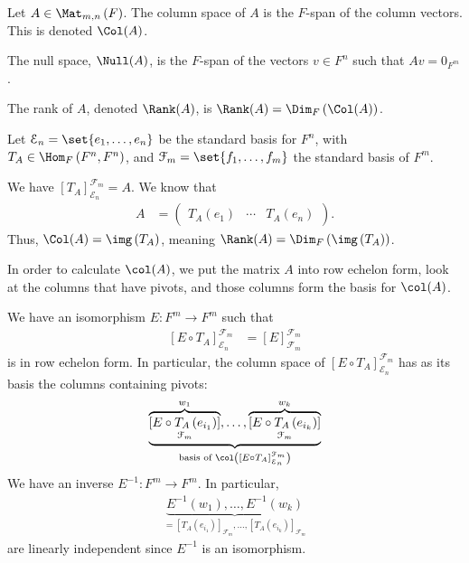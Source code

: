 \documentclass[10pt]{mypackage}
\begin{document}
\begin{definition}
  Let $A\in \Mat_{m,n}\left(F\right)$. The column space of $A$ is the $F$-span of the column vectors. This is denoted $\Col(A)$.\newline

  The null space, $\Null(A)$, is the $F$-span of the vectors $v\in F^n$ such that $Av = 0_{F^m}$.\newline

  The rank of $A$, denoted $\Rank(A)$, is $\Rank(A) = \Dim_{F}\left(\Col(A)\right)$.
\end{definition}
  Let $\mathcal{E}_n = \set{e_1,\dots,e_n}$ be the standard basis for $F^n$, with $T_A \in \Hom_{F}\left(F^n,F^n\right)$, and $\mathcal{F}_m = \set{f_1,\dots,f_m}$ the standard basis of $F^m$.\newline

  We have $\left[T_A\right]_{\mathcal{E}_n}^{\mathcal{F}_m} = A$. We know that
  \begin{align*}
    A &= \begin{pmatrix}T_A\left(e_1\right) & \cdots & T_A\left(e_n\right)\end{pmatrix}.
  \end{align*}
  Thus, $\Col(A) = \img\left(T_A\right)$, meaning $\Rank(A) = \Dim_{F}\left(\img\left(T_A\right)\right)$.\newline

In order to calculate $\col(A)$, we put the matrix $A$ into row echelon form, look at the columns that have pivots, and those columns form the basis for $\col(A)$.\newline

We have an isomorphism $E: F^m\rightarrow F^m$ such that
\begin{align*}
  \left[E\circ T_A\right]_{\mathcal{E}_n}^{\mathcal{F}_m} &= \left[E\right]_{\mathcal{F}_m}^{\mathcal{F}_m}
\end{align*}
is in row echelon form. In particular, the column space of $\left[E\circ T_A\right]_{\mathcal{E}_n}^{\mathcal{F}_m}$ has as its basis the columns containing pivots:
\begin{align*}
  \underbrace{\overbrace{\left[E\circ T_A\left(e_{i_1}\right)\right]}^{w_1}_{\mathcal{F}_m},\dots,\overbrace{\left[E\circ T_A\left(e_{i_k}\right)\right]}^{w_k}_{\mathcal{F}_m}}_{\text{basis of }\col\left(\left[E\circ T_A\right]_{\mathcal{E}_n}^{\mathcal{F}_m}\right)}
\end{align*}
We have an inverse $E^{-1}: F^{m}\rightarrow F^m$. In particular,
\begin{align*}
  \underbrace{E^{-1}\left(w_1\right),\dots,E^{-1}\left(w_k\right)}_{=\left[T_{A}\left(e_{i_1}\right)\right]_{\mathcal{F}_m},\dots,\left[T_{A}\left(e_{i_k}\right)\right]_{\mathcal{F}_m}}
\end{align*}
are linearly independent since $E^{-1}$ is an isomorphism.\newline
\end{document}
